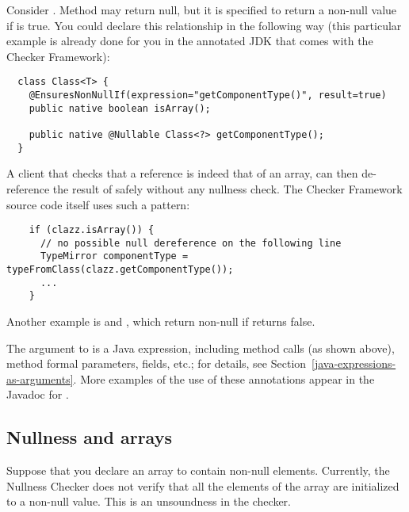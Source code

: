 Consider .
Method
may return null, but it is specified to return a non-null value if
 is
true.
You could declare this relationship in the following way (this particular
example is already
done for you in the annotated JDK that comes with the Checker Framework):

\begin{Verbatim}
  class Class<T> {
    @EnsuresNonNullIf(expression="getComponentType()", result=true)
    public native boolean isArray();

    public native @Nullable Class<?> getComponentType();
  }
\end{Verbatim}

A client that checks that a  reference is indeed that of an array,
can then de-reference the result of  safely
without any nullness check.  The Checker Framework source code itself
uses such a pattern:

\begin{Verbatim}
    if (clazz.isArray()) {
      // no possible null dereference on the following line
      TypeMirror componentType = typeFromClass(clazz.getComponentType());
      ...
    }
\end{Verbatim}

Another example is 
and , which return
non-null if 
returns false.

The argument to  is a Java expression, including method calls
(as shown above), method formal parameters, fields, etc.; for details, see
Section~\ref{java-expressions-as-arguments}.
More examples of the use of these annotations appear in the Javadoc for
.


\subsection{Nullness and arrays\label{nullness-arrays}}

Suppose that you declare an array to contain non-null elements.
Currently, the Nullness Checker does not verify that all the elements of the
array are initialized to a non-null value.  This is an unsoundness in the
checker.

